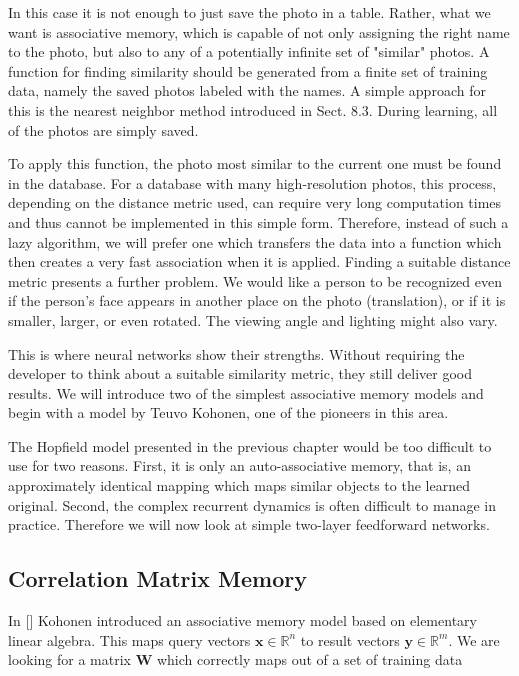 \documentclass[10pt]{book}
\begin{document}
In this case it is not enough to just save the photo in a table. Rather, what we want is associative memory, which is capable of not only assigning the right name to the photo, but also to any of a potentially infinite set of "similar" photos. A function for finding similarity should be generated from a finite set of training data, namely the saved photos labeled with the names. A simple approach for this is the nearest neighbor method introduced in Sect. 8.3. During learning, all of the photos are simply saved.

To apply this function, the photo most similar to the current one must be found in the database. For a database with many high-resolution photos, this process, depending on the distance metric used, can require very long computation times and thus cannot be implemented in this simple form. Therefore, instead of such a lazy algorithm, we will prefer one which transfers the data into a function which then creates a very fast association when it is applied.
Finding a suitable distance metric presents a further problem. We would like a person to be recognized even if the person's face appears in another place on the photo (translation), or if it is smaller, larger, or even rotated. The viewing angle and lighting might also vary.

This is where neural networks show their strengths. Without requiring the developer to think about a suitable similarity metric, they still deliver good results. We will introduce two of the simplest associative memory models and begin with a model by Teuvo Kohonen, one of the pioneers in this area.

The Hopfield model presented in the previous chapter would be too difficult to use for two reasons. First, it is only an auto-associative memory, that is, an approximately identical mapping which maps similar objects to the learned original. Second, the complex recurrent dynamics is often difficult to manage in practice. Therefore we will now look at simple two-layer feedforward networks.

\subsection{Correlation Matrix Memory}
In [\cite{kohonen1972correlation}] Kohonen introduced an associative memory model based on elementary linear algebra. This maps query vectors $\boldsymbol{x} \in \mathbb{R}^{n}$ to result vectors $\boldsymbol{y} \in \mathbb{R}^{m}$. We are looking for a matrix $\boldsymbol{W}$ which correctly maps out of a set of training data
\end{document}
